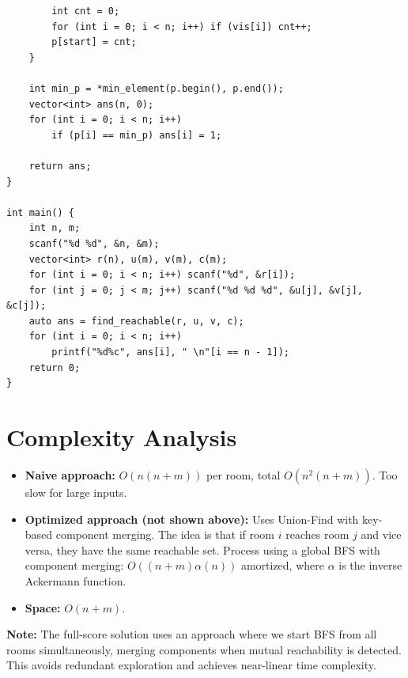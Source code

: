 \documentclass[11pt,a4paper]{article}
\begin{document}
\begin{lstlisting}
        int cnt = 0;
        for (int i = 0; i < n; i++) if (vis[i]) cnt++;
        p[start] = cnt;
    }

    int min_p = *min_element(p.begin(), p.end());
    vector<int> ans(n, 0);
    for (int i = 0; i < n; i++)
        if (p[i] == min_p) ans[i] = 1;

    return ans;
}

int main() {
    int n, m;
    scanf("%d %d", &n, &m);
    vector<int> r(n), u(m), v(m), c(m);
    for (int i = 0; i < n; i++) scanf("%d", &r[i]);
    for (int j = 0; j < m; j++) scanf("%d %d %d", &u[j], &v[j], &c[j]);
    auto ans = find_reachable(r, u, v, c);
    for (int i = 0; i < n; i++)
        printf("%d%c", ans[i], " \n"[i == n - 1]);
    return 0;
}
\end{lstlisting}

\section{Complexity Analysis}
\begin{itemize}
  \item \textbf{Naive approach:} $O(n(n + m))$ per room, total $O(n^2(n + m))$. Too slow for large inputs.
  \item \textbf{Optimized approach (not shown above):} Uses Union-Find with key-based component merging. The idea is that if room $i$ reaches room $j$ and vice versa, they have the same reachable set. Process using a global BFS with component merging: $O((n + m) \alpha(n))$ amortized, where $\alpha$ is the inverse Ackermann function.
  \item \textbf{Space:} $O(n + m)$.
\end{itemize}

\textbf{Note:} The full-score solution uses an approach where we start BFS from all rooms simultaneously, merging components when mutual reachability is detected. This avoids redundant exploration and achieves near-linear time complexity.
\end{document}
